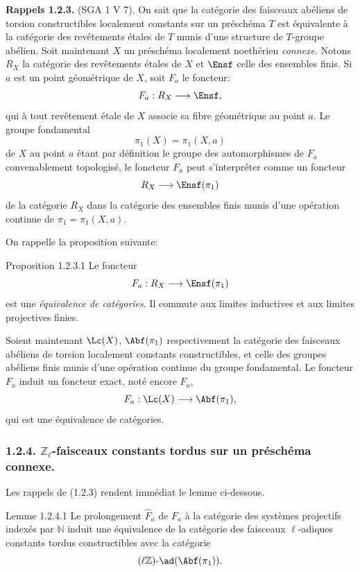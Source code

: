 \textbf{Rappels 1.2.3.} (SGA 1 V 7). On sait que la catégorie des faisceaux abéliens de torsion constructibles localement constants sur un préschéma \(T\) est équivalente à la catégorie des revêtements étales de \(T\) munis d'une structure de \(T\)-groupe abélien. Soit maintenant \(X\) un préschéma localement noethérien \emph{connexe}. Notons \(R_X\) la catégorie des revêtements étales de \(X\) et \(\Ensf\) celle des ensembles finis. Si \(a\) est un point géométrique de \(X\), soit \(F_a\) le foncteur:
\[
F_a:R_X\longrightarrow \Ensf,
\]
qui à
tout revêtement étale de \(X\) associe sa fibre géométrique au point \(a\). Le groupe fondamental
\[
\pi_1(X)=\pi_1(X,a)
\]
de \(X\) au point \(a\) étant par définition le groupe des automorphismes de \(F_a\) convenablement topologisé, le foncteur \(F_a\) peut s'interpréter comme un foncteur
\[
R_X\longrightarrow \Ensf(\pi_1)
\]
de la catégorie \(R_X\) dans la catégorie des ensembles finis munis d'une opération continue de \(\pi_1=\pi_1(X,a)\).

On rappelle la proposition suivante:

\begin{statement}{Proposition 1.2.3.1}
Le foncteur
\[
F_a:R_X\longrightarrow \Ensf(\pi_1)
\]
est une \emph{équivalence de catégories}. Il commute aux limites inductives et aux limites projectives finies.
\end{statement}

Soient maintenant \(\Lc(X)\), \(\Abf(\pi_1)\) respectivement la catégorie des faisceaux abéliens de torsion localement constants constructibles, et celle des groupes abéliens finis munis d'une opération continue du groupe fondamental. Le foncteur \(F_a\) induit un foncteur exact, noté encore \(F_a\),
\[
F_a:\Lc(X)\longrightarrow \Abf(\pi_1),
\]
qui est une équivalence de catégories.

\subsubsection*{1.2.4. \(\mathbb{Z}_\ell\)-faisceaux constants tordus sur un préschéma connexe.}

Les rappels de (1.2.3) rendent immédiat le lemme ci-dessous.

\begin{statement}{Lemme 1.2.4.1}
Le prolongement \(\widehat F_a\) de \(F_a\) à la catégorie des systèmes projectifs indexés par \(\mathbb{N}\) induit une équivalence de la catégorie des faisceaux \(\ell\)-adiques constants tordus constructibles avec la catégorie
\[
(\ell\mathbb{Z})\text{-}\ad(\Abf(\pi_1)).
\]
\end{statement}

